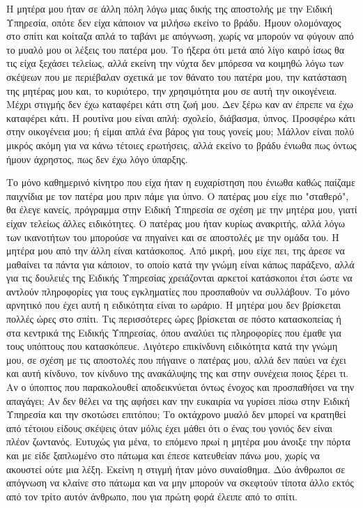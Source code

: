 \documentclass[12pt,twoside, openany]{book}
\begin{document}
Η μητέρα μου ήταν σε άλλη πόλη λόγω μιας δικής της αποστολής με την Ειδική Υπηρεσία, οπότε δεν είχα κάποιον να μιλήσω εκείνο το βράδυ. Ήμουν ολομόναχος στο σπίτι και κοίταζα απλά το ταβάνι με απόγνωση, χωρίς να μπορούν να φύγουν από το μυαλό μου οι λέξεις του πατέρα μου. Το ήξερα ότι μετά από λίγο καιρό ίσως θα τις είχα ξεχάσει τελείως, αλλά εκείνη την νύχτα δεν μπόρεσα να κοιμηθώ λόγω των σκέψεων που με περιέβαλαν σχετικά με τον θάνατο του πατέρα μου, την κατάσταση της μητέρας μου και, το κυριότερο, την χρησιμότητα μου σε αυτή την οικογένεια. Μέχρι στιγμής δεν έχω καταφέρει κάτι στη ζωή μου. Δεν ξέρω καν αν έπρεπε να έχω καταφέρει κάτι. Η ρουτίνα μου είναι απλή: σχολείο, διάβασμα, ύπνος. Προσφέρω κάτι στην οικογένεια μου; ή είμαι απλά ένα βάρος για τους γονείς μου; Μάλλον είναι πολύ μικρός ακόμη για να κάνω τέτοιες ερωτήσεις, αλλά εκείνο το βράδυ ένιωθα πως όντως ήμουν άχρηστος, πως δεν έχω λόγο ύπαρξης. 

Το μόνο καθημερινό κίνητρο που είχα ήταν η ευχαρίστηση που ένιωθα καθώς παίζαμε παιχνίδια με τον πατέρα μου πριν πάμε για ύπνο. Ο πατέρας μου είχε πιο "σταθερό", θα έλεγε κανείς, πρόγραμμα στην Ειδική Υπηρεσία σε σχέση με την μητέρα μου, γιατί είχαν τελείως άλλες ειδικότητες. Ο πατέρας μου ήταν κυρίως ανακριτής, αλλά λόγω των ικανοτήτων του μπορούσε να πηγαίνει και σε αποστολές με την ομάδα του. Η μητέρα μου από την άλλη είναι κατάσκοπος. Από μικρή, μου είχε πει, της άρεσε να μαθαίνει τα πάντα για κάποιον, το οποίο κατά την γνώμη είναι κάπως παράξενο, αλλά για τις δουλειές της Ειδικής Υπηρεσίας χρειάζονται αρκετοί κατάσκοποι έτσι ώστε να αντλούν πληροφορίες για τους εγκληματίες που προσπαθούν να συλλάβουν. Το μόνο αρνητικό που έχει αυτή η ειδικότητα είναι το ωράριο. Η μητέρα μου δεν βρίσκεται πολλές ώρες στο σπίτι. Τις περισσότερες ώρες βρίσκεται σε πόστο κατασκοπείας ή στα κεντρικά της Ειδικής Υπηρεσίας, όπου αναλύει τις πληροφορίες που έμαθε για τους υπόπτους που κατασκόπευε. Λιγότερο επικίνδυνη ειδικότητα κατά την γνώμη μου, σε σχέση με τις αποστολές που πήγαινε ο πατέρας μου, αλλά δεν παύει να έχει και αυτή κίνδυνο, τον κίνδυνο της ανακάλυψης της και στην συνέχεια ποιος ξέρει τι. Αν ο ύποπτος που παρακολουθεί αποδεικνύεται όντως ένοχος και προσπαθήσει να την απαγάγει; Αν δεν θέλει να της αφήσει καν την ευκαιρία να γυρίσει πίσω στην Ειδική Υπηρεσία και την σκοτώσει επιτόπου; Το οκτάχρονο μυαλό δεν μπορεί να κρατηθεί από τέτοιου είδους σκέψεις όταν μόλις έχει μάθει ότι ο ένας του γονιός δεν είναι πλέον ζωντανός. Ευτυχώς για μένα, το επόμενο πρωί η μητέρα μου άνοιξε την πόρτα και με είδε ξαπλωμένο στο πάτωμα και έπεσε κατευθείαν πάνω μου, χωρίς να ακουστεί ούτε μια λέξη. Εκείνη η στιγμή ήταν μόνο συναίσθημα. Δύο άνθρωποι σε απόγνωση να κλαίνε στο πάτωμα και να μην μπορούν να σκεφτούν τίποτα άλλο εκτός από τον τρίτο αυτόν άνθρωπο, που για πρώτη φορά έλειπε από το σπίτι. 
\end{document}
